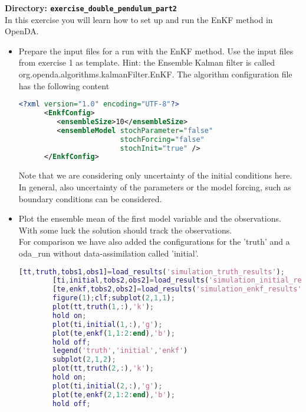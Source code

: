{\bf Directory: {\tt exercise\_double\_pendulum\_part2}}\\

In this exercise you will learn how to set up and run the EnKF method in OpenDA.

\begin{itemize}
  \item Prepare the input files for a run with the EnKF method. Use the input
        files from exercise 1 as template. Hint: the Ensemble Kalman filter
        is called org.openda.algorithms.kalmanFilter.EnKF. The algorithm
        configuration file has the following content
      \begin{lstlisting}[language=XML,frame=single,caption={XML-input for EnKF algorithm}]
      <?xml version="1.0" encoding="UTF-8"?>
      <EnkfConfig>
         <ensembleSize>10</ensembleSize>
         <ensembleModel stochParameter="false"
                        stochForcing="false"
                        stochInit="true" />
      </EnkfConfig>
      \end{lstlisting}
      Note that we are considering only uncertainty of the initial conditions here. In general, also uncertainty of the 
      parameters or the model forcing, such as boundary conditions can be considered.

  \item Plot the ensemble mean of the first model variable and the observations.
        With some luck the solution should track the observations. \\
        For comparison we have also added the configurations for the 'truth' and a oda\_run
        without data-assimilation called 'initial'.
        
        \begin{lstlisting}[language=Matlab,frame=single,caption={Matlab}]
        [tt,truth,tobs1,obs1]=load_results('simulation_truth_results');
        [ti,initial,tobs2,obs2]=load_results('simulation_initial_results');
        [te,enkf,tobs2,obs2]=load_results('simulation_enkf_results');
        figure(1);clf;subplot(2,1,1);
        plot(tt,truth(1,:),'k');
        hold on;
        plot(ti,initial(1,:),'g');
        plot(te,enkf(1,1:2:end),'b');
        hold off;
        legend('truth','initial','enkf')
        subplot(2,1,2);
        plot(tt,truth(2,:),'k');
        hold on;
        plot(ti,initial(2,:),'g');
        plot(te,enkf(2,1:2:end),'b');
        hold off;
        \end{lstlisting}


\end{itemize}

